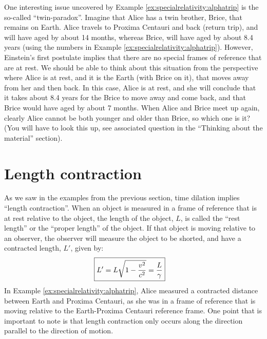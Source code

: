 One interesting issue uncovered by Example \ref{ex:specialrelativity:alphatrip} is the so-called ``twin-paradox''. Imagine that Alice has a twin brother, Brice, that remains on Earth. Alice travels to Proxima Centauri and back (return trip), and will have aged by about 14 months, whereas Brice, will have aged by about 8.4 years (using the numbers in Example \ref{ex:specialrelativity:alphatrip}). However, Einstein's first postulate implies that there are no special frames of reference that are at rest. We should be able to think about this situation from the perspective where Alice is at rest, and it is the Earth (with Brice on it), that moves away from her and then back. In this case, Alice is at rest, and she will conclude that it takes about 8.4 years for the Brice to move away and come back, and that Brice would have aged by about 7 months. When Alice and Brice meet up again, clearly Alice cannot be both younger and older than Brice, so which one is it? (You will have to look this up, see associated question in the ``Thinking about the material'' section).

\section{Length contraction}
As we saw in the examples from the previous section, time dilation implies ``length contraction''. When an object is measured in a frame of reference that is at rest relative to the object, the length of the object, $L$, is called the ``rest length'' or the ``proper length'' of the object. If that object is moving relative to an observer, the observer will measure the object to be shorted, and have a contracted length, $L'$, given by:
\begin{align*}
\Aboxed{L'=L\sqrt{1-\frac{v^2}{c^2}} =\frac{L}{\gamma}}
\end{align*}
In Example \ref{ex:specialrelativity:alphatrip}, Alice measured a contracted distance between Earth and Proxima Centauri, as she was in a frame of reference that is moving relative to the Earth-Proxima Centauri reference frame. One point that is important to note is that length contraction only occurs along the direction parallel to the direction of motion.

